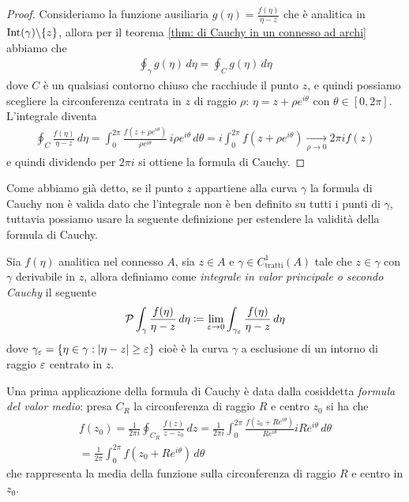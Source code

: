 \begin{proof}
  Consideriamo la funzione ausiliaria $ g(\eta) = \frac{f(\eta)}{\eta - z} $ che è analitica in $ \textnormal{Int}(\gamma) \backslash \{z\} $, allora per il 
  teorema \ref{thm: di Cauchy in un connesso ad archi} abbiamo che 
  \begin{align}
    \oint_\gamma g(\eta)\,d\eta = \oint_C g(\eta) \,d\eta
  \end{align}
  dove $ C $ è un qualsiasi contorno chiuso che racchiude il punto $ z $, e quindi possiamo scegliere la circonferenza centrata in $ z $ di raggio 
  $ \rho $: $ \eta = z + \rho e^{i\theta} $ con $ \theta \in [0,2\pi] $. L'integrale diventa
  \begin{align}
    \oint_C \frac{f(\eta)}{\eta - z} \,d\eta = \int_0^{2\pi} \frac{f(z + \rho e^{i\theta})}{\rho e^{i\theta}} \,i \rho e^{i\theta} \,d\theta 
    = i \int_0^{2\pi} f(z + \rho e^{i\theta}) \xrightarrow[\rho \to 0]{} 2\pi i f(z)
  \end{align}
  e quindi dividendo per $ 2\pi i $ si ottiene la formula di Cauchy.
\end{proof}

Come abbiamo già detto, se il punto $ z $ appartiene alla curva $ \gamma $ la formula di Cauchy non è valida dato che l'integrale non è ben definito su 
tutti i punti di $ \gamma $, tuttavia possiamo usare la seguente definizione per estendere la validità della formula di Cauchy.

\begin{definition}
  Sia $ f(\eta) $ analitica nel connesso $ A $, sia $ z \in A $ e $ \gamma \in C^1_{\text{tratti}}(A) $ tale che $ z \in \gamma $ con $ \gamma $ derivabile 
  in $ z $, allora definiamo come \textit{integrale in valor principale o secondo Cauchy} il seguente 
  \begin{align}
    \operatorname{\mathcal{P}} \int_\gamma \frac{f(\eta)}{\eta - z} \, d\eta \coloneq \lim_{\varepsilon\to 0} \int_{\gamma_\varepsilon} \frac{f(\eta)}{\eta - z} \, d\eta
  \end{align}
  dove $ \gamma_\varepsilon = \{ \eta \in \gamma: \left|{\eta - z}\right| \geq \varepsilon \} $ cioè è la curva $ \gamma $ a esclusione di un intorno di raggio $ \varepsilon $ 
  centrato in $ z $.
\end{definition}

Una prima applicazione della formula di Cauchy è data dalla cosiddetta \textit{formula del valor medio}: presa $ C_R $ la circonferenza di raggio $ R $ 
e centro $ z_0 $ si ha che
\begin{gather}
  f(z_0) = \frac{1}{2\pi i} \oint_{C_R} \frac{f(z)}{z - z_0} \,dz 
  = \frac1{2\pi i} \int_0^{2\pi} \frac{f(z_0 + R e^{i\theta})}{R e^{i \theta}}i R e^{i \theta}\, d\theta
  \\
   = \frac1{2\pi} \int_0^{2\pi} f({z_0 + R e^{i\theta}})\, d\theta
\end{gather}
che rappresenta la media della funzione sulla circonferenza di raggio $ R $ e centro in $ z_0 $.

